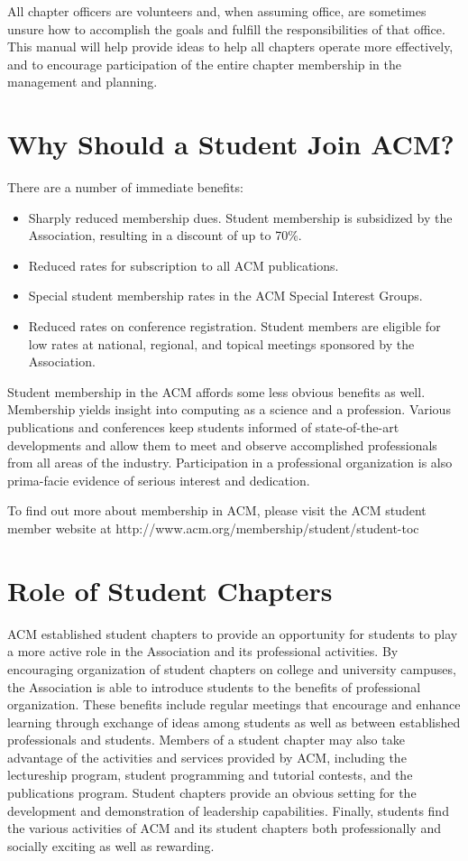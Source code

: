 All chapter officers are volunteers and, when assuming office, are sometimes unsure how to accomplish the goals and fulfill the responsibilities of that office. This manual will help provide ideas to help all chapters operate more effectively, and to encourage participation of the entire chapter membership in the management and planning.

\section{Why Should a Student Join ACM?}
\label{sec:sec03}

There are a number of immediate benefits:
	\begin{itemize}
		\item Sharply reduced membership dues. Student membership is subsidized by the Association, resulting in a discount of up to 70\%.
        \item Reduced rates for subscription to all ACM publications.
		\item Special student membership rates in the ACM Special Interest Groups.
		\item Reduced rates on conference registration. Student members are eligible for low rates at national, regional, and topical meetings sponsored by the Association.
	\end{itemize}

Student membership in the ACM affords some less obvious benefits as well. Membership yields insight into computing as a science and a profession. Various publications and conferences keep students informed of state-of-the-art developments and allow them to meet and observe accomplished professionals from all areas of the industry. Participation in a professional organization is also prima-facie evidence of serious interest and dedication.

To find out more about membership in ACM, please visit the ACM student member website at http://www.acm.org/membership/student/student-toc

\section{Role of Student Chapters}
\label{sec:sec04}

ACM established student chapters to provide an opportunity for students to play a more active role in the Association and its professional activities. By encouraging organization of student chapters on college and university campuses, the Association is able to introduce students to the benefits of professional organization. These benefits include regular meetings that encourage and enhance learning through exchange of ideas among students as well as between established professionals and students. Members of a student chapter may also take advantage of the activities and services provided by ACM, including the lectureship program, student programming and tutorial contests, and the publications program. Student chapters provide an obvious setting for the development and demonstration of leadership capabilities. Finally, students find the various activities of ACM and its student chapters both professionally and socially exciting as well as rewarding.

